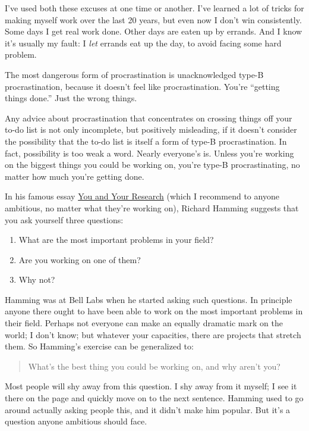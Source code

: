 I've used both these excuses at one time or another. I've learned a lot
of tricks for making myself work over the last 20 years, but even now I
don't win consistently. Some days I get real work done. Other days are
eaten up by errands. And I know it's usually my fault: I \emph{let}
errands eat up the day, to avoid facing some hard problem.

The most dangerous form of procrastination is unacknowledged type-B
procrastination, because it doesn't feel like procrastination. You're
``getting things done.'' Just the wrong things.

Any advice about procrastination that concentrates on crossing things
off your to-do list is not only incomplete, but positively misleading,
if it doesn't consider the possibility that the to-do list is itself a
form of type-B procrastination. In fact, possibility is too weak a word.
Nearly everyone's is. Unless you're working on the biggest things you
could be working on, you're type-B procrastinating, no matter how much
you're getting done.

In his famous essay \href{hamming.html}{You and Your Research} (which I
recommend to anyone ambitious, no matter what they're working on),
Richard Hamming suggests that you ask yourself three questions:

\begin{enumerate}
\def\labelenumi{\arabic{enumi}.}
\item
  What are the most important problems in your field?
\item
  Are you working on one of them?
\item
  Why not?
\end{enumerate}

Hamming was at Bell Labs when he started asking such questions. In
principle anyone there ought to have been able to work on the most
important problems in their field. Perhaps not everyone can make an
equally dramatic mark on the world; I don't know; but whatever your
capacities, there are projects that stretch them. So Hamming's exercise
can be generalized to:

\begin{quote}
What's the best thing you could be working on, and why aren't you?
\end{quote}

Most people will shy away from this question. I shy away from it myself;
I see it there on the page and quickly move on to the next sentence.
Hamming used to go around actually asking people this, and it didn't
make him popular. But it's a question anyone ambitious should face.

